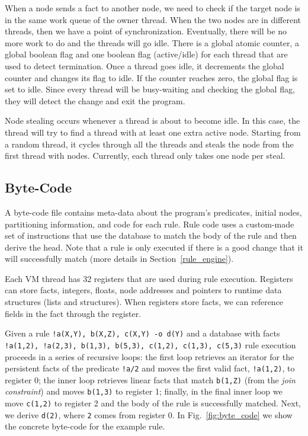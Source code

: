 When a node sends a fact to another node, we need to check if the target node is in the same work queue of the owner thread.
When the two nodes are in different threads, then we have a point of synchronization. Eventually,
there will be no more work to do and the threads will go idle. There is a global atomic counter, a global
boolean flag and one boolean flag (active/idle) for each thread that are used to detect termination.
Once a thread goes idle, it decrements the global counter and changes its flag to idle. If the counter
reaches zero, the global flag is set to idle. Since every thread will be busy-waiting and checking
the global flag, they will detect the change and exit the program.

Node stealing occurs whenever a thread is about to become idle. In this case, the thread will try to find a
thread with at least one extra active node. Starting from a random thread, it cycles through all the threads
and steals the node from the first thread with nodes. Currently, each thread only takes one node per steal.

\subsection{Byte-Code}

A byte-code file contains meta-data about the program's predicates, initial nodes, partitioning
information, and code for each rule. Rule code uses a custom-made set of instructions that
use the database to match the body of the rule and then derive the head. Note that a rule
is only executed if there is a good change that it will successfully match (more details
in Section~\ref{rule_engine}).

Each VM thread has 32 registers that are used during rule execution.
Registers can store facts, integers, floats, node addresses and pointers to runtime 
data structures (lists and structures). When registers store facts, we can reference
fields in the fact through the register.

Given a rule \texttt{!a(X,Y), b(X,Z), c(X,Y) -o d(Y)} and a database with facts
\texttt{!a(1,2), !a(2,3), b(1,3), b(5,3), c(1,2), c(1,3), c(5,3)} rule execution proceeds
in a series of recursive loops: the first loop retrieves an iterator for the persistent facts
of the predicate \texttt{!a/2} and moves the first valid fact, \texttt{!a(1,2)},
to register 0; the inner loop retrieves linear facts that match \texttt{b(1,Z)} (from the
\emph{join constraint}) and moves \texttt{b(1,3)} to register 1; finally, in the final inner
loop we move \texttt{c(1,2)} to register 2 and the body of the rule is successfully matched. Next, we
derive \texttt{d(2)}, where \texttt{2} comes from register 0.
In Fig.~\ref{fig:byte_code} we show the concrete byte-code for the example rule.

